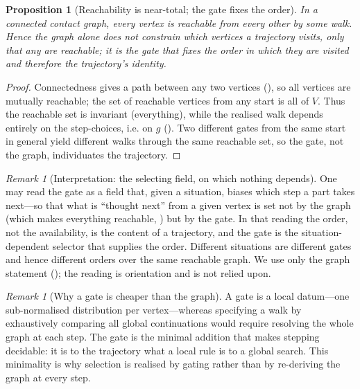 \documentclass[11pt,a4paper]{article}
\theoremstyle{thmstyle}
\newtheorem{proposition}[theorem]{Proposition}
\theoremstyle{definition}
\theoremstyle{remark}
\newtheorem{remark}[theorem]{Remark}
\newcommand{\V}{V}                        %
\newcommand{\gate}{g}                     %
\begin{document}
\begin{proposition}[Reachability is near-total; the gate fixes the order]
\label{prop:reachability}
In a connected contact graph, every vertex is reachable from every other by some
walk. Hence the graph alone does not constrain \emph{which} vertices a trajectory
visits, only that any are reachable; it is the gate that fixes the \emph{order}
in which they are visited and therefore the trajectory's identity.
\end{proposition}

\begin{proof}
Connectedness gives a path between any two vertices (), so all
vertices are mutually reachable; the set of reachable vertices from any start is
all of $\V$. Thus the reachable set is invariant (everything), while the realised
walk depends entirely on the step-choices, i.e. on $\gate$ ().
Two different gates from the same start in general yield different walks through
the same reachable set, so the gate, not the graph, individuates the trajectory.
\end{proof}

\begin{remark}[Interpretation: the selecting field, on which nothing depends]
\label{rem:field}
One may read the gate as a field that, given a situation, biases which step a
part takes next---so that what is ``thought next'' from a given vertex is set not
by the graph (which makes everything reachable, ) but by
the gate. In that reading the order, not the availability, is the content of a
trajectory, and the gate is the situation-dependent selector that supplies the
order. Different situations are different gates and hence different orders over
the same reachable graph. We use only the graph statement
\textup{(}\textup{)}; the reading is
orientation and is not relied upon.
\end{remark}

\begin{remark}[Why a gate is cheaper than the graph]
\label{rem:gate-cheap}
A gate is a local datum---one sub-normalised distribution per vertex---whereas
specifying a walk by exhaustively comparing all global continuations would
require resolving the whole graph at each step. The gate is the minimal addition
that makes stepping decidable: it is to the trajectory what a local rule is to a
global search. This minimality is why selection is realised by gating rather than
by re-deriving the graph at every step.
\end{remark}
\end{document}
